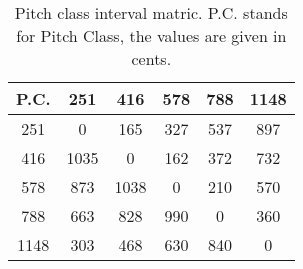 \begin{table}
\begin{tabular}{c||  c  c  c  c  c  }	
P.C. & 251 & 416 & 578 & 788 & 1148 \\
\hline
\hline
251 & 0 & 165 & 327 & 537 & 897\\
416 & 1035 & 0 & 162 & 372 & 732\\
578 & 873 & 1038 & 0 & 210 & 570\\
788 & 663 & 828 & 990 & 0 & 360\\
1148 & 303 & 468 & 630 & 840 & 0     	
\end{tabular}
\label{tbl:pitch_class_interval_matrix}
\caption{Pitch class interval matric. P.C. stands for Pitch Class, the values are given in cents.}
\end{table}
